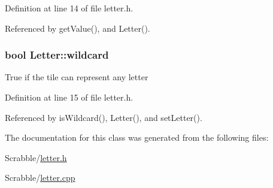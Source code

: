 Definition at line 14 of file letter.\-h.



Referenced by get\-Value(), and Letter().

\hypertarget{class_letter_a6c34169c5f139924fb14154391bf1925}{
\subsubsection[{wildcard}]{\setlength{\rightskip}{0pt plus 5cm}bool Letter\-::wildcard\hspace{0.3cm}{\ttfamily [private]}}}\label{class_letter_a6c34169c5f139924fb14154391bf1925}
True if the tile can represent any letter 

Definition at line 15 of file letter.\-h.



Referenced by is\-Wildcard(), Letter(), and set\-Letter().



The documentation for this class was generated from the following files\-:\begin{DoxyCompactItemize}
\item 
Scrabble/\hyperlink{letter_8h}{letter.\-h}\item 
Scrabble/\hyperlink{letter_8cpp}{letter.\-cpp}\end{DoxyCompactItemize}
